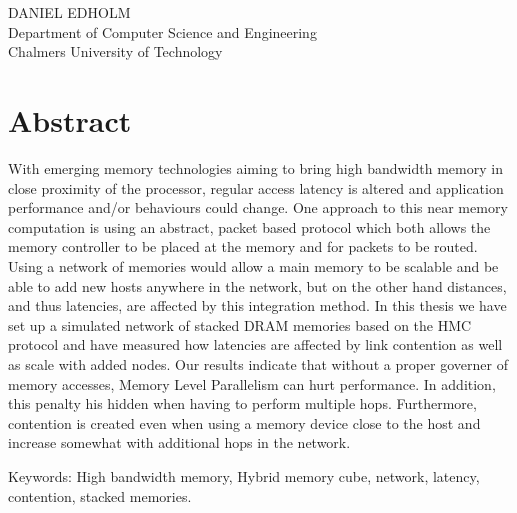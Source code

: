 \THETITLE\\
\TITLEDESCR\\
DANIEL EDHOLM\\
Department of Computer Science and Engineering\\
Chalmers University of Technology\\

\thispagestyle{plain}			%
\section*{Abstract}
With emerging memory technologies aiming to bring high bandwidth memory in close proximity of the processor, regular access latency is altered and application performance and/or behaviours could change. One approach to this near memory computation is using an abstract, packet based protocol which both allows the memory controller to be placed at the memory and for packets to be routed. Using a network of memories would allow a main memory to be scalable and be able to add new hosts anywhere in the network, but on the other hand distances, and thus latencies, are affected by this integration method. In this thesis we have set up a simulated network of stacked DRAM memories based on the HMC protocol and have measured how latencies are affected by link contention as well as scale with added nodes. Our results indicate that without a proper governer of memory accesses, Memory Level Parallelism can hurt performance. In addition, this penalty his hidden when having to perform multiple hops. Furthermore, contention is created even when using a memory device close to the host and increase somewhat with additional hops in the network. 

\vfill
Keywords: High bandwidth memory, Hybrid memory cube, network, latency, contention, stacked memories.

\newpage				%
\thispagestyle{empty}
\mbox{}